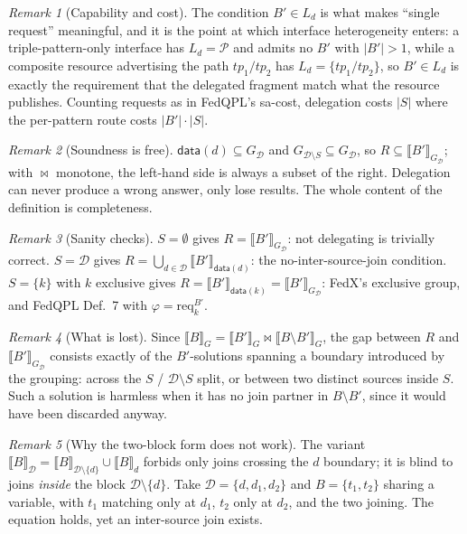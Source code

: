 \documentclass[11pt,a4paper]{article}
\theoremstyle{definition}
\theoremstyle{plain}
\theoremstyle{remark}
\newtheorem*{remark}{Remark}
\newcommand{\Dd}{\mathcal{D}}
\newcommand{\dataf}{\mathsf{data}}
\newcommand{\ev}[2]{\llbracket #1 \rrbracket_{#2}}
\begin{document}
\begin{remark}[Capability and cost]
The condition $B' \in L_d$ is what makes ``single request'' meaningful, and it is the
point at which interface heterogeneity enters: a triple-pattern-only interface has
$L_d = \mathcal{P}$ and admits no $B'$ with $|B'| > 1$, while a composite resource
advertising the path $tp_1/tp_2$ has $L_d = \{tp_1/tp_2\}$, so $B' \in L_d$ is exactly
the requirement that the delegated fragment match what the resource publishes. Counting
requests as in FedQPL's sa-cost, delegation costs $|S|$ where the per-pattern route costs
$|B'| \cdot |S|$.
\end{remark}

\begin{remark}[Soundness is free]
$\dataf(d) \subseteq G_{\Dd}$ and $G_{\Dd \setminus S} \subseteq G_{\Dd}$, so
$R \subseteq \ev{B'}{G_{\Dd}}$; with $\bowtie$ monotone, the left-hand side is always a
subset of the right. Delegation can never produce a wrong answer, only lose results. The
whole content of the definition is completeness.
\end{remark}

\begin{remark}[Sanity checks]
$S = \emptyset$ gives $R = \ev{B'}{G_{\Dd}}$: not delegating is trivially correct.
$S = \Dd$ gives $R = \bigcup_{d \in \Dd} \ev{B'}{\dataf(d)}$: the no-inter-source-join
condition. $S = \{k\}$ with $k$ exclusive gives $R = \ev{B'}{\dataf(k)} =
\ev{B'}{G_{\Dd}}$: FedX's exclusive group, and FedQPL Def.~7 with
$\varphi = \mathrm{req}^{B'}_{k}$.
\end{remark}

\begin{remark}[What is lost]
Since $\ev{B}{G} = \ev{B'}{G} \bowtie \ev{B \setminus B'}{G}$, the gap between $R$ and
$\ev{B'}{G_{\Dd}}$ consists exactly of the $B'$-solutions spanning a boundary introduced
by the grouping: across the $S$ / $\Dd \setminus S$ split, or between two distinct
sources inside $S$. Such a solution is harmless when it has no join partner in
$B \setminus B'$, since it would have been discarded anyway.
\end{remark}

\begin{remark}[Why the two-block form does not work]
The variant $\ev{B}{\Dd} = \ev{B}{\Dd \setminus \{d\}} \cup \ev{B}{d}$ forbids only
joins crossing the $d$ boundary; it is blind to joins \emph{inside} the block
$\Dd \setminus \{d\}$. Take $\Dd = \{d, d_1, d_2\}$ and $B = \{t_1,t_2\}$ sharing a
variable, with $t_1$ matching only at $d_1$, $t_2$ only at $d_2$, and the two joining.
The equation holds, yet an inter-source join exists.
\end{remark}
\end{document}
